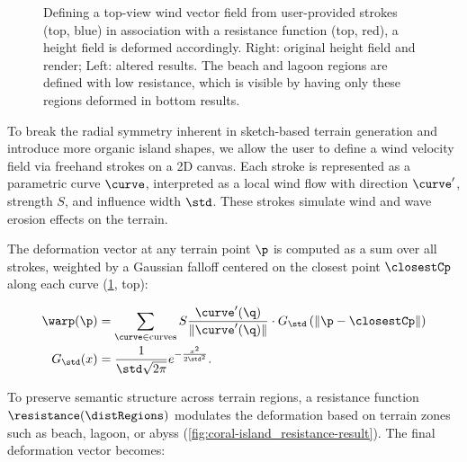 
\begin{figure}
    \caption{Defining a top-view wind vector field from user-provided strokes (top, blue) in association with a resistance function (top, red), a height field is deformed accordingly. Right: original height field and render; Left: altered results. The beach and lagoon regions are defined with low resistance, which is visible by having only these regions deformed in bottom results. }
    \label{fig:coral-island_wind-effect-result}
\end{figure}

To break the radial symmetry inherent in sketch-based terrain generation and introduce more organic island shapes, we allow the user to define a wind velocity field via freehand strokes on a 2D canvas. Each stroke is represented as a parametric curve $\curve$, interpreted as a local wind flow with direction $\curve'$, strength $S$, and influence width $\std$. These strokes simulate wind and wave erosion effects on the terrain.

The deformation vector at any terrain point $\p$ is computed as a sum over all strokes, weighted by a Gaussian falloff centered on the closest point $\closestCp$ along each curve (\cref{fig:coral-island_wind-effect-result}, top):

\begin{align}
    \warp(\p) &= \sum_{\curve \in \text{curves}} S \frac{\curve'(\q)}{\| \curve'(\q) \| } \cdot G_\std\left(\| \p - \closestCp \| \right) \\
    G_\std(x) &= \frac{1}{\std \sqrt{2\pi}} e^{-\frac{x^2}{2 \std^2}}.
\end{align}

To preserve semantic structure across terrain regions, a resistance function $\resistance(\distRegions)$ modulates the deformation based on terrain zones such as beach, lagoon, or abyss (\cref{fig:coral-island_resistance-result}). The final deformation vector becomes:


